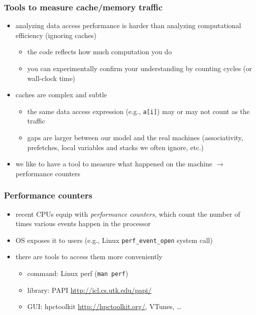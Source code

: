\documentclass[12pt,dvipdfmx]{beamer}
\newcommand{\ao}[1]{{\color{blue}#1}}
\begin{document}
\begin{frame}[fragile]
\frametitle{Tools to measure cache/memory traffic}
\begin{itemize}
\item analyzing data access performance is harder than
  analyzing computational efficiency (ignoring caches)
  \begin{itemize}
  \item the code reflects how much computation you do
  \item you can experimentally confirm your understanding
    by counting cycles (or wall-clock time)
  \end{itemize}

\item caches are complex and subtle
  \begin{itemize}
  \item the same data access expression (e.g., {\tt a[i]})
    may or may not count as the traffic
  \item gaps are larger between our model and the real machines
    (associativity, prefetches, local variables and stacks we
    often ignore, etc.)
  \end{itemize}

\item we like to have a tool to measure what
  happened on the machine $\rightarrow$ performance counters
\end{itemize}
\end{frame}


\begin{frame}[fragile]
\frametitle{Performance counters}
\begin{itemize}
\item recent CPUs equip with \ao{\em performance counters},
  which count the number of times various events happen
  in the processor

\item OS exposes it to users (e.g., Linux 
  {\tt perf\_event\_open} system call)

\item there are tools to access them more conveniently 
  \begin{itemize}
  \item command: Linux perf ({\tt man perf})
  \item library: PAPI \url{http://icl.cs.utk.edu/papi/} 
  \item GUI: hpctoolkit \url{http://hpctoolkit.org/}, VTunes, \ldots
  \end{itemize}
\end{itemize}
\end{frame}
\end{document}
